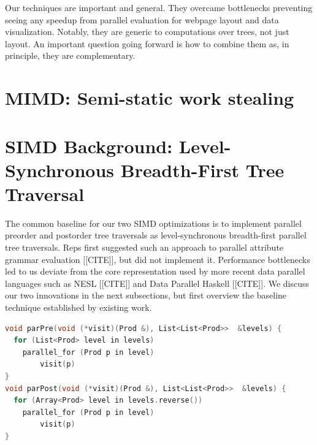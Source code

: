 Our techniques are important and general. They overcame bottlenecks preventing seeing any speedup from parallel evaluation for webpage layout and data visualization. Notably, they are generic to computations over trees, not just layout. An important question going forward is how to combine them as, in principle, they are complementary.

\section{MIMD: Semi-static work stealing}



\section{SIMD Background: Level-Synchronous Breadth-First Tree Traversal}
The common baseline for our two SIMD optimizations is to implement parallel preorder and postorder tree traversals as level-synchronous breadth-first parallel tree traversals. Reps first suggested such an approach to parallel attribute grammar evaluation [[CITE]], but did not implement it. Performance bottlenecks led to us deviate from the core representation used by more recent data parallel languages such as NESL [[CITE]] and Data Parallel Haskell [[CITE]]. We discuss our two innovations in the next subsections, but first overview the baseline technique established by existing work.

\newsavebox{\bfsVisitor}
\begin{lrbox}{\bfsVisitor}%
\begin{lstlisting}[mathescape,language=C++,morekeywords={spawn,join,reverse,parallel_for}]
void parPre(void (*visit)(Prod &), List<List<Prod>>  &levels) {
  for (List<Prod> level in levels)
  	parallel_for (Prod p in level)
		visit(p)
}
void parPost(void (*visit)(Prod &), List<List<Prod>>  &levels) {
  for (Array<Prod> level in levels.reverse())
  	parallel_for (Prod p in level)
		visit(p)
}\end{lstlisting}
\end{lrbox}

